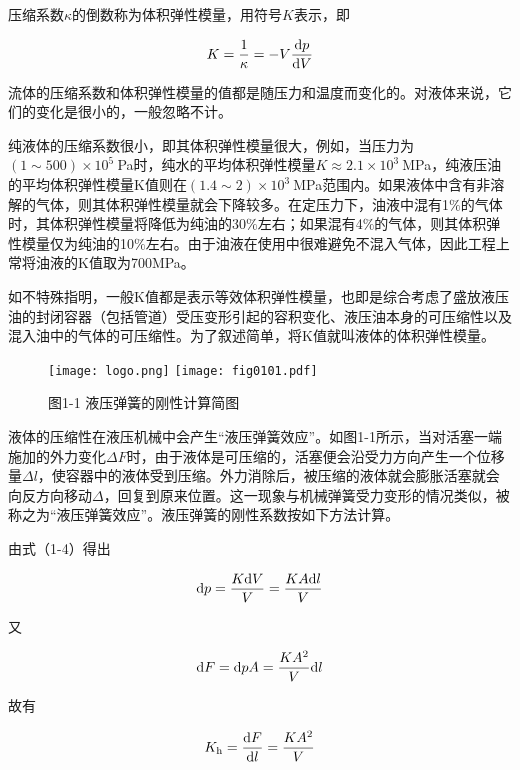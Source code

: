 压缩系数$\kappa $的倒数称为体积弹性模量，用符号$\mathit{K}$表示，即

\begin{equation}
    K=\frac{1}{\kappa }=-V\frac{{\rm d}p}{{\rm d}V}
\end{equation}

流体的压缩系数和体积弹性模量的值都是随压力和温度而变化的。对液体来说，它们的变化是很小的，一般忽略不计。

纯液体的压缩系数很小，即其体积弹性模量很大，例如，当压力为$(1\sim 500)\times 10^5\ $Pa时，纯水的平均体积弹性模量$K\approx 2.1\times 10^3\ $MPa，纯液压油的平均体积弹性模量K值则在$(1.4\sim 2)\times 10^3\ $MPa范围内。如果液体中含有非溶解的气体，则其体积弹性模量就会下降较多。在定压力下，油液中混有1$\%$的气体时，其体积弹性模量将降低为纯油的30$\%$左右；如果混有4$\%$的气体，则其体积弹性模量仅为纯油的10$\%$左右。由于油液在使用中很难避免不混入气体，因此工程上常将油液的K值取为700MPa。

如不特殊指明，一般K值都是表示等效体积弹性模量，也即是综合考虑了盛放液压油的封闭容器（包括管道）受压变形引起的容积变化、液压油本身的可压缩性以及混入油中的气体的可压缩性。为了叙述简单，将K值就叫液体的体积弹性模量。

\begin{figure}[htb]%
    \centering
    \ifOpenSource
    \texttt{[image: logo.png]}
    \else
    \texttt{[image: fig0101.pdf]}%
    \fi
    \caption{图1-1 液压弹簧的刚性计算简图}
    \label{fig:fig0101}%
\end{figure}

液体的压缩性在液压机械中会产生“液压弹簧效应”。如图1-1所示，当对活塞一端施加的外力变化$\Delta F$时，由于液体是可压缩的，活塞便会沿受力方向产生一个位移量$\Delta l$，使容器中的液体受到压缩。外力消除后，被压缩的液体就会膨胀活塞就会向反方向移动$\Delta $，回复到原来位置。这一现象与机械弹簧受力变形的情况类似，被称之为“液压弹簧效应”。液压弹簧的刚性系数按如下方法计算。

由式（1-4）得出

$${\rm d}p=\frac{K{\rm d}V}{V}=\frac{KA{\rm d}l}{V}$$

\noindent 又

$${\rm d}F={\rm d}pA=\frac{KA^2}{V}{\rm d}l$$

\noindent 故有

\begin{equation}
    K_{\rm h}=\frac{{\rm d}F}{{\rm d}l}=\frac{KA^2}{V}
\end{equation}

